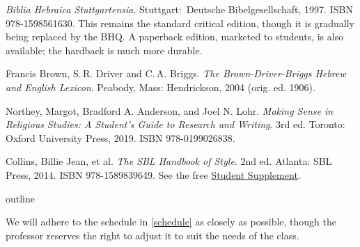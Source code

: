 \documentclass[titlepage]{article}
\begin{document}
\begingroup
\renewcommand{\section}[2]{}%
\begin{thebibliography}{Making Sense}%

    \emph{Biblia Hebraica Stuttgartensia}.
    Stuttgart: Deutsche Bibel\-ge\-sell\-schaft, 1997. ISBN 978-1598561630.
    This remains the standard critical edition, though it is gradually
    being replaced by the BHQ. A paperback edition, marketed to
    students, is also available; the hardback is much more durable.

    Francis Brown, S.\,R. Driver and C.\,A. Briggs. \emph{The
    Brown-Driver-Briggs Hebrew and English Lexicon}. Peabody, Mass:
    Hendrickson, 2004 (orig. ed. 1906).

	 Northey, Margot, Bradford A. Anderson, and Joel N. Lohr.
	\emph{Making Sense in Religious Studies: A Student's Guide to Research and Writing}.
	3rd ed. Toronto: Oxford University Press, 2019. ISBN 978-0199026838.

	 Collins, Billie Jean, et al.
	\emph{The SBL Handbook of Style}.
	2nd ed. Atlanta: SBL Press, 2014. ISBN 978-1589839649. See the free
	\href{https://www.sbl-site.org/assets/pdfs/pubs/SBLHSsupp2015-02.pdf}{Student Supplement}.

\end{thebibliography}
\endgroup


\section{Course Outline}
\label{outline}

We will adhere to the schedule in \autoref{schedule} as closely as
possible, though the professor reserves the right to adjust it to suit
the needs of the class.
\end{document}
